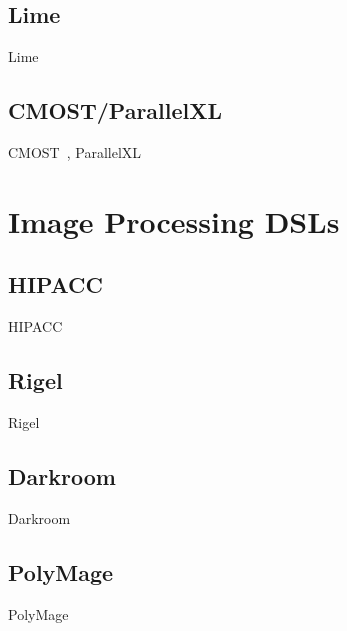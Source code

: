 \subsection{Lime}
Lime~\cite{lime}
%

\subsection{CMOST/ParallelXL}
CMOST~\cite{zhang_DAC_2015_cmost}, ParallelXL~\cite{chen_micro_2018_parallelXL}



\section{Image Processing DSLs}

\subsection{HIPACC}
HIPACC~\cite{membarth_2016_hipa}
%

\subsection{Rigel}
Rigel~\cite{hegarty_2016_rigel}
%

\subsection{Darkroom}
Darkroom~\cite{darkroom}
%

\subsection{PolyMage}
PolyMage~\cite{mullapudi_asplos_2015_polymage}

